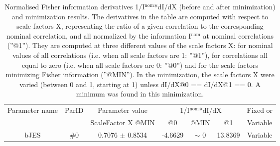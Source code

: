 \begin{table}[H]
\scriptsize
\begin{center}
\renewcommand{\arraystretch}{1.1}
\begin{tabular}{|c|c|c|ccc|c|}
\hline
Parameter name & ParID & Parameter value &\multicolumn{3}{|c|}{1/I$^\mathrm{nom}$*dI/dX} & Fixed or\\
 & & ScaleFactor X @MIN & @0 & @MIN & @1 & Variable\\
\hline
 {\tiny bJES} & \#0 &    0.7076 $\pm$    0.8534 &   -4.6629 & {\tiny $\sim$ }0 &   13.8369 & Variable \\
\hline
\end{tabular}
\renewcommand{\arraystretch}{1}
\caption{Normalised Fisher information derivatives 1/I$^\mathrm{nom}$*dI/dX (before and after minimization) and minimization results.  The derivatives in the table are computed with respect to scale factors X, representing the ratio of a given correlation to the corresponding nominal correlation, and all normalized by the information I$^\mathrm{nom}$ at nominal correlations (''@1''). They are computed at three different values of the scale factors X: for nominal values of all correlations (i.e. when all scale factors are 1: ''@1''), for correlations all equal to zero (i.e. when all scale factors are 0: ''@0'') and for the scale factors minimizing Fisher information (''@MIN''). In the minimization, the scale factors X were varied (between 0 and 1, starting at 1) unless dI/dX@0 == dI/dX@1 == 0. A minimum was found in this minimization.}
\end{center}
\end{table}

